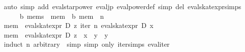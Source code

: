 \begin{isabellebody}
%
\isadelimproof
%
\endisadelimproof
%
\isatagproof
{}\isamarkupfalse%
\ {}auto\ simp\ add{}\ eval{}star{}power\ eval{}jp\ eval{}power{}def\ simp\ del{}\ eval{}skat{}expr{}simps{}{}{}{}\isanewline
\ \ \isamarkupfalse%
\ {}\ {}{}\ {}{}b\ mems{}\ \ mem\ {}{}\ {}{}b\ mem{}\ \ n\isanewline
\ \ \isamarkupfalse%
\ {}mem\ {}\ eval{}skat{}expr\ D\ z\ {}iter\ n\ {}eval{}skat{}expr\ D\ x{}\ {}{}{}\isanewline
\ \ \isamarkupfalse%
\ {}mem\ {}\ eval{}skat{}expr\ D\ {}z\ {}{}{}\ x\ {}{}{}\ y\ {}{}{}\ y{}\ {}{}\isanewline
\ \ \isamarkupfalse%
\ {}induct\ n\ arbitrary{}\ {}{}\ simp{}\ simp\ only{}\ iter{}simps\ eval{}iter{}{}\isanewline

\end{isabellebody}
